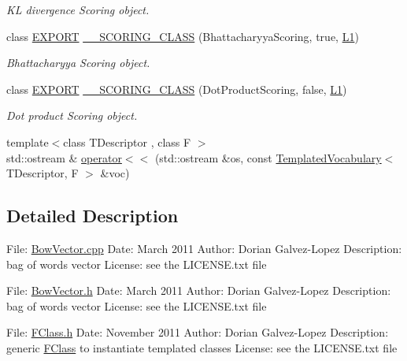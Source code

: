 \begin{DoxyCompactItemize}
\begin{DoxyCompactList}\small\item\em KL divergence Scoring object. \end{DoxyCompactList}\item 
class \mbox{\hyperlink{config_8h_a3472d8cdbb788d5f1815b3522595bc49}{E\+X\+P\+O\+RT}} \mbox{\hyperlink{namespace_d_bo_w2_a7135fab6a887afb7d2b4e6254b4875ea}{\+\_\+\+\_\+\+S\+C\+O\+R\+I\+N\+G\+\_\+\+C\+L\+A\+SS}} (Bhattacharyya\+Scoring, true, \mbox{\hyperlink{namespace_d_bo_w2_a53e9e0bcfc25c861815e413a7cf3fa51a94f5879ff083c0a8364805ae4f9c2d5c}{L1}})
\begin{DoxyCompactList}\small\item\em Bhattacharyya Scoring object. \end{DoxyCompactList}\item 
class \mbox{\hyperlink{config_8h_a3472d8cdbb788d5f1815b3522595bc49}{E\+X\+P\+O\+RT}} \mbox{\hyperlink{namespace_d_bo_w2_a8b3715c76bccab82aa18804b6b7dc1ba}{\+\_\+\+\_\+\+S\+C\+O\+R\+I\+N\+G\+\_\+\+C\+L\+A\+SS}} (Dot\+Product\+Scoring, false, \mbox{\hyperlink{namespace_d_bo_w2_a53e9e0bcfc25c861815e413a7cf3fa51a94f5879ff083c0a8364805ae4f9c2d5c}{L1}})
\begin{DoxyCompactList}\small\item\em Dot product Scoring object. \end{DoxyCompactList}\item 
{\footnotesize template$<$class T\+Descriptor , class F $>$ }\\std\+::ostream \& \mbox{\hyperlink{namespace_d_bo_w2_aecdf616fe16d2cf09f521a603b9d43f1}{operator$<$$<$}} (std\+::ostream \&os, const \mbox{\hyperlink{class_d_bo_w2_1_1_templated_vocabulary}{Templated\+Vocabulary}}$<$ T\+Descriptor, F $>$ \&voc)
\end{DoxyCompactItemize}


\subsection{Detailed Description}
File\+: \mbox{\hyperlink{_bow_vector_8cpp}{Bow\+Vector.\+cpp}} Date\+: March 2011 Author\+: Dorian Galvez-\/\+Lopez Description\+: bag of words vector License\+: see the L\+I\+C\+E\+N\+S\+E.\+txt file

File\+: \mbox{\hyperlink{_bow_vector_8h}{Bow\+Vector.\+h}} Date\+: March 2011 Author\+: Dorian Galvez-\/\+Lopez Description\+: bag of words vector License\+: see the L\+I\+C\+E\+N\+S\+E.\+txt file

File\+: \mbox{\hyperlink{_f_class_8h}{F\+Class.\+h}} Date\+: November 2011 Author\+: Dorian Galvez-\/\+Lopez Description\+: generic \mbox{\hyperlink{class_d_bo_w2_1_1_f_class}{F\+Class}} to instantiate templated classes License\+: see the L\+I\+C\+E\+N\+S\+E.\+txt file

